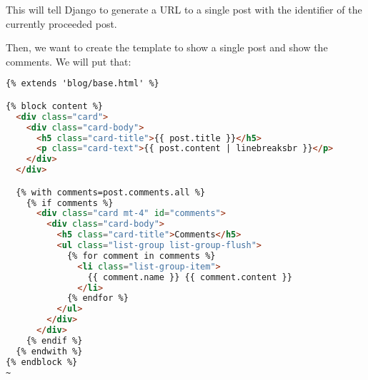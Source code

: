         This will tell Django to generate a URL to a single post with the 
        identifier of the currently proceeded post.

        Then, we want to create the template  
        to show a single post and show the comments. We will put that:
        
        \begin{lstlisting}[language=html, escapechar=~, title=blog/templates/post\textunderscore single.html]
{% extends 'blog/base.html' %}

{% block content %}
  <div class="card">
    <div class="card-body">
      <h5 class="card-title">{{ post.title }}</h5>
      <p class="card-text">{{ post.content | linebreaksbr }}</p>
    </div>
  </div>

  {% with comments=post.comments.all %}
    {% if comments %}
      <div class="card mt-4" id="comments">
        <div class="card-body">
          <h5 class="card-title">Comments</h5>
          <ul class="list-group list-group-flush">
            {% for comment in comments %}
              <li class="list-group-item">
                {{ comment.name }} {{ comment.content }}
              </li>
            {% endfor %}
          </ul>
        </div>
      </div>
    {% endif %}
  {% endwith %}
{% endblock %}
~
        \end{lstlisting}
